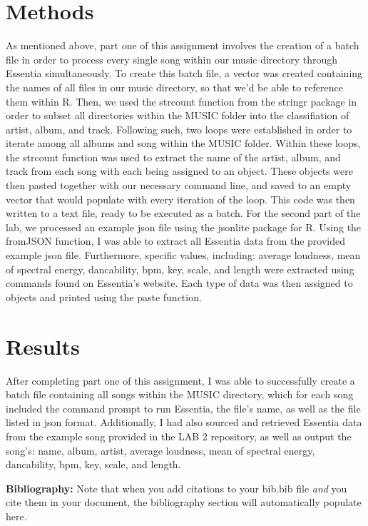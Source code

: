 \documentclass{article}\usepackage[]{graphicx}\usepackage[]{xcolor}
\begin{document}
\begin{multicols}{2}
\section{Methods}
 As mentioned above, part one of this assignment involves the creation of a batch file in order to process every single song within our music directory through Essentia simultaneously. To create this batch file, a vector was created containing the names of all files in our music directory, so that we'd be able to reference them within R. Then, we used the strcount function from the stringr package in order to subset all directories within the MUSIC folder into the classifiation of artist, album, and track. Following such, two loops were established in order to iterate among all albums and song within the MUSIC folder. Within these loops, the strcount function was used to extract the name of the artist, album, and track from each song with each being assigned to an object. These objects were then pasted together with our necessary command line, and saved to an empty vector that would populate with every iteration of the loop. This code was then written to a text file, ready to be executed as a batch. For the second part of the lab, we processed an example json file using the jsonlite package for R. Using the fromJSON function, I was able to extract all Essentia data from the provided example json file. Furthermore, specific values, including: average loudness, mean of spectral energy, dancability, bpm, key, scale, and length were extracted using commands found on Essentia's website. Each type of data was then assigned to objects and printed using the paste function.
 


\section{Results}
 After completing part one of this assignment, I was able to successfully create a batch file containing all songs within the MUSIC directory, which for each song included the command prompt to run Essentia, the file's name, as well as the file listed in json format. Additionally, I had also sourced and retrieved Essentia data from the example song provided in the LAB 2 repository, as well as output the song's: name, album, artist, average loudness, mean of spectral energy, dancability, bpm, key, scale, and length.




\vspace{2em}

\noindent\textbf{Bibliography:} Note that when you add citations to your bib.bib file \emph{and}
you cite them in your document, the bibliography section will automatically populate here.

\begin{tiny}

\end{tiny}
\end{multicols}
\end{document}
